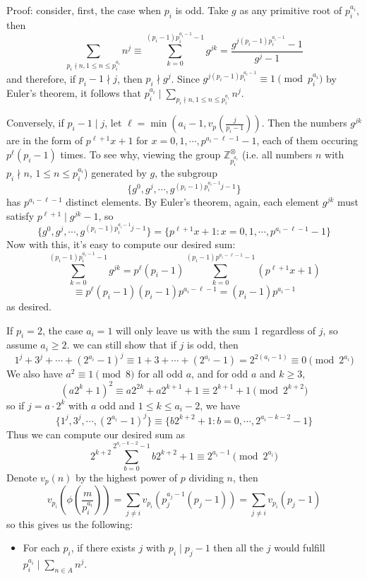 \documentclass[11pt,a4paper]{article}
\newcommand{\bbZ}{\mathbb Z}
\newcommand{\<}{\langle}
\renewcommand{\>}{\rangle}
\begin{document}
\begin{enumerate}
    Proof: consider, first, the case when $p_i$ is odd. Take $g$ as any primitive root of $p_i^{a_i}$, then 
    \[
    \sum_{p_i\nmid n, 1\le n\le p_i^{a_i}}n^j
    \equiv \sum_{k=0}^{(p_i-1)p_i^{a_i-1}-1} g^{jk}
    =\frac{g^{j (p_i-1)p_i^{a_i-1}}-1}{g^j-1}
    \]
    and therefore, if $p_i-1\nmid j$, then $p_i\nmid g^j$. 
    Since $g^{j (p_i-1)p_i^{a_i-1}}\equiv 1\pmod{p_i^{a_i}}$ by Euler's theorem, 
    it follows that $p_i^{a_i}\mid \sum_{p_i\nmid n, 1\le n\le p_i^{a_i}}n^j$. 
    
    Conversely, if $p_i-1\mid j$, let $\ell=\min(a_i-1, v_p(\frac{j}{p_i-1}))$. 
    Then the numbers $g^{jk}$ are in the form of $p^{\ell+1}x+1$ for $x=0, 1, \cdots, p^{a_i-\ell-1}-1$, 
    each of them occuring $p^{\ell}(p_i-1)$ times. 
    To see why, viewing the group $\bbZ_{p_i^{a_i}}^{\otimes}$ (i.e. all numbers $n$ with $p_i\nmid n$, $1\le n\le p_i^{a_i}$) generated by $g$, the subgroup 
    \[
    \{g^0, g^j, \cdots, g^{(p_i-1)p_i^{a_i-1}j-1}\}
    \]
    has $p^{a_i-\ell-1}$ distinct elements. 
    By Euler's theorem, again, each element $g^{jk}$ must satisfy $p^{\ell+1}\mid g^{jk}-1$, so 
    \[
    \{g^0, g^j, \cdots, g^{(p_i-1)p_i^{a_i-1}j-1}\}
    =\{p^{\ell+1}x+1: x=0, 1, \cdots, p^{a_i-\ell-1}-1\}
    \]
    Now with this, it's easy to compute our desired sum: 
    \[
    \sum_{k=0}^{(p_i-1)p_i^{a_i-1}-1} g^{jk}
    =p^{\ell}(p_i-1)\sum_{k=0}^{(p_i-1)p^{a_i-\ell-1}-1}(p^{\ell+1}x+1)
    \]\[
    \equiv p^{\ell}(p_i-1)(p_i-1)p^{a_i-\ell-1}
    =(p_i-1)p^{a_i-1}
    \]
    as desired. 
    
    If $p_i=2$, the case $a_i=1$ will only leave us with the sum 1 regardless of $j$, so assume $a_i\ge 2$. 
    we can still show that if $j$ is odd, then 
    \[
    1^j+3^j+\cdots + (2^{a_i}-1)^j
    \equiv 1+3+\cdots + (2^{a_i}-1)
    =2^{2(a_i-1)}
    \equiv 0\pmod{2^{a_i}}
    \]
    We also have $a^2\equiv 1\pmod{8}$ for all odd $a$, and for odd $a$ and $k\ge 3$, 
    \[
    (a2^k+1)^2
    \equiv a2^{2k}+a2^{k+1}+1
    \equiv 2^{k+1}+1\pmod{2^{k+2}}
    \]
    so if $j=a\cdot 2^k$ with $a$ odd and $1\le k\le a_i-2$, we have 
    \[
    \{1^j, 3^j, \cdots, (2^{a_i}-1)^j\}
    \equiv 
    \{b2^{k+2}+1: b=0, \cdots, 2^{a_i-k-2}-1\}
    \]
    Thus we can compute our desired sum as 
    \[
    2^{k+2}\sum_{b=0}^{2^{a_i-k-2}-1}b2^{k+2}+1
    \equiv 2^{a_i-1}\pmod{2^{a_i}}
    \]
	Denote $v_p(n)$ by the highest power of $p$ dividing $n$, 
	then 
	\[
	v_{p_i}\left(\phi\left(\frac{m}{p_i^{a_i}}\right)\right)
	=\sum_{j\neq i} v_{p_i}(p_j^{a_j-1}(p_j-1))
	=\sum_{j\neq i} v_{p_i}(p_j-1)
	\]
	so this gives us the following: 
	\begin{itemize}
		\item For each $p_i$, if there exists $j$ with $p_i\mid p_j-1$ then all the $j$ would fulfill $p_i^{a_i}\mid \sum_{n\in A}n^j$. 
		

\end{itemize}
\end{enumerate}
\end{document}
